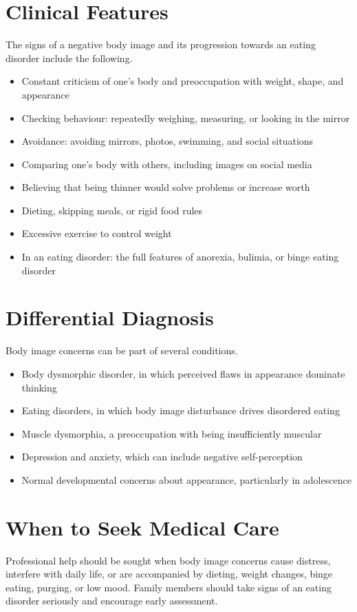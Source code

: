 \section*{Clinical Features}
The signs of a negative body image and its progression towards an eating disorder include the following.
\begin{itemize}
    \item Constant criticism of one's body and preoccupation with weight, shape, and appearance
    \item Checking behaviour: repeatedly weighing, measuring, or looking in the mirror
    \item Avoidance: avoiding mirrors, photos, swimming, and social situations
    \item Comparing one's body with others, including images on social media
    \item Believing that being thinner would solve problems or increase worth
    \item Dieting, skipping meals, or rigid food rules
    \item Excessive exercise to control weight
    \item In an eating disorder: the full features of anorexia, bulimia, or binge eating disorder
\end{itemize}

\section*{Differential Diagnosis}
Body image concerns can be part of several conditions.
\begin{itemize}
    \item Body dysmorphic disorder, in which perceived flaws in appearance dominate thinking
    \item Eating disorders, in which body image disturbance drives disordered eating
    \item Muscle dysmorphia, a preoccupation with being insufficiently muscular
    \item Depression and anxiety, which can include negative self-perception
    \item Normal developmental concerns about appearance, particularly in adolescence
\end{itemize}

\section*{When to Seek Medical Care}
Professional help should be sought when body image concerns cause distress, interfere with daily life, or are accompanied by dieting, weight changes, binge eating, purging, or low mood. Family members should take signs of an eating disorder seriously and encourage early assessment.

